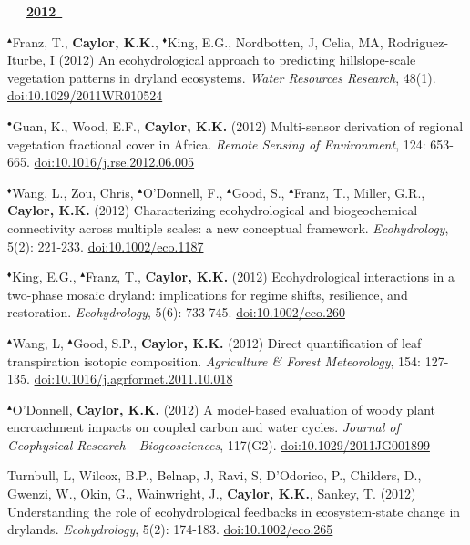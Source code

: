 \begin{etaremune}
\vspace{0.1in}
\mbox{\ \ \ \underline{\textbf{2012 }}}
\vspace{0.1in}

\item $^{\blacktriangle}$Franz, T., \textbf{ Caylor, K.K.}, $^{\blacklozenge}$King, E.G., Nordbotten, J, Celia, MA, Rodriguez-Iturbe, I (2012) An ecohydrological approach to predicting hillslope-scale vegetation patterns in dryland ecosystems. \emph{Water Resources Research}, 48(1). \href{https://doi.org/10.1029/2011WR010524}{doi:10.1029/2011WR010524}
\item $^{\bullet}$Guan, K., Wood, E.F., \textbf{ Caylor, K.K.} (2012) Multi-sensor derivation of regional vegetation fractional cover in Africa. \emph{Remote Sensing of Environment}, 124: 653-665. \href{https://doi.org/10.1016/j.rse.2012.06.005}{doi:10.1016/j.rse.2012.06.005}
\item $^{\blacklozenge}$Wang, L., Zou, Chris, $^{\blacktriangle}$O'Donnell, F., $^{\blacktriangle}$Good, S., $^{\blacktriangle}$Franz, T., Miller, G.R., \textbf{ Caylor, K.K.} (2012) Characterizing ecohydrological and biogeochemical connectivity across multiple scales: a new conceptual framework. \emph{Ecohydrology}, 5(2): 221-233. \href{https://doi.org/10.1002/eco.1187}{doi:10.1002/eco.1187}
\item $^{\blacklozenge}$King, E.G., $^{\blacktriangle}$Franz, T., \textbf{ Caylor, K.K.} (2012) Ecohydrological interactions in a two-phase mosaic dryland: implications for regime shifts, resilience, and restoration. \emph{Ecohydrology}, 5(6): 733-745. \href{https://doi.org/10.1002/eco.260}{doi:10.1002/eco.260}
\item $^{\blacktriangle}$Wang, L, $^{\blacktriangle}$Good, S.P., \textbf{ Caylor, K.K.} (2012) Direct quantification of leaf transpiration isotopic composition. \emph{Agriculture \& Forest Meteorology}, 154: 127-135. \href{https://doi.org/10.1016/j.agrformet.2011.10.018}{doi:10.1016/j.agrformet.2011.10.018}
\item $^{\blacktriangle}$O'Donnell, \textbf{ Caylor, K.K.} (2012) A model-based evaluation of woody plant encroachment impacts on coupled carbon and water cycles. \emph{Journal of Geophysical Research - Biogeosciences}, 117(G2). \href{https://doi.org/10.1029/2011JG001899}{doi:10.1029/2011JG001899}
\item Turnbull, L, Wilcox, B.P., Belnap, J, Ravi, S, D'Odorico, P., Childers, D., Gwenzi, W., Okin, G., Wainwright, J., \textbf{ Caylor, K.K.}, Sankey, T. (2012) Understanding the role of ecohydrological feedbacks in ecosystem-state change in drylands. \emph{Ecohydrology}, 5(2): 174-183. \href{https://doi.org/10.1002/eco.265}{doi:10.1002/eco.265}

\end{etaremune}
